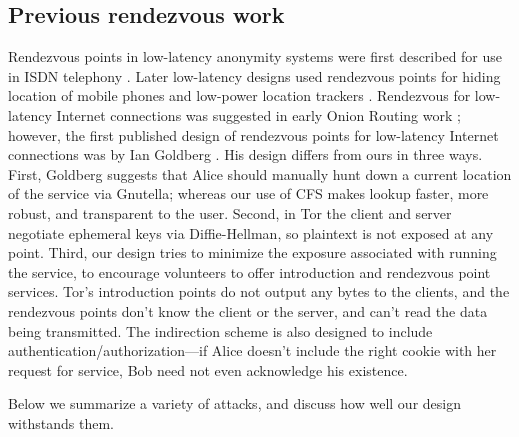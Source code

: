 \documentclass[times,10pt,twocolumn]{article}
\begin{document}
\subsection{Previous rendezvous work}

Rendezvous points in low-latency anonymity systems were first
described for use in ISDN telephony \cite{isdn-mixes,jerichow-jsac98}.
Later low-latency designs used rendezvous points for hiding location
of mobile phones and low-power location trackers
\cite{federrath-ih96,reed-protocols97}.  Rendezvous for low-latency
Internet connections was suggested in early Onion Routing work
\cite{or-ih96}; however, the first published design of rendezvous
points for low-latency Internet connections was by Ian Goldberg
\cite{ian-thesis}. His design differs from
ours in three ways. First, Goldberg suggests that Alice should manually
hunt down a current location of the service via Gnutella; whereas our
use of CFS makes lookup faster, more robust, and transparent to the
user. Second, in Tor the client and server negotiate ephemeral keys
via Diffie-Hellman, so plaintext is not exposed at any point. Third,
our design tries to minimize the exposure associated with running the
service, to encourage volunteers to offer introduction and rendezvous
point services. Tor's introduction points do not output any bytes to the
clients, and the rendezvous points don't know the client or the server,
and can't read the data being transmitted. The indirection scheme is
also designed to include authentication/authorization---if Alice doesn't
include the right cookie with her request for service, Bob need not even
acknowledge his existence.

\label{sec:attacks}


  
Below we summarize a variety of attacks, and discuss how well our
design withstands them.
\end{document}
